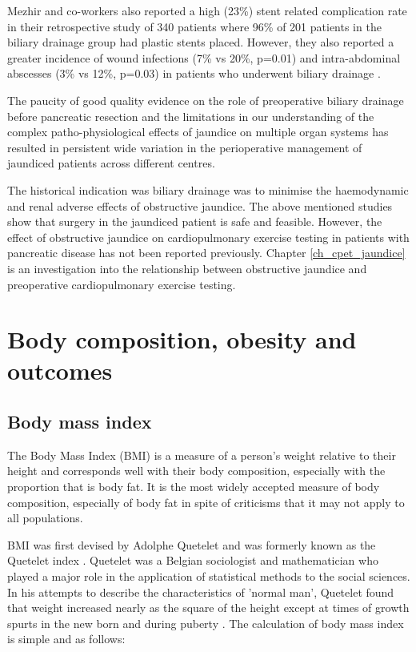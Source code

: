Mezhir and co-workers also reported a high (23\%) stent related complication rate in their retrospective study of 340 patients where 96\% of 201 patients in the biliary drainage group had plastic stents placed. 
However, they also reported a greater incidence of wound infections (7\% vs 20\%, p=0.01) and intra-abdominal abscesses (3\% vs 12\%, p=0.03) in patients who underwent biliary drainage \parencite{mezhir_matched_2009}.

The paucity of good quality evidence on the role of preoperative biliary drainage before pancreatic resection \parencite{wang_preoperative_2008} and the limitations in our understanding of the complex patho-physiological effects of jaundice on multiple organ systems has resulted in persistent wide variation in the perioperative management of jaundiced patients across different centres.

The historical indication was biliary drainage was to minimise the haemodynamic and renal adverse effects of obstructive jaundice. 
The above mentioned studies show that surgery in the jaundiced patient is safe and feasible. 
However, the effect of obstructive jaundice on cardiopulmonary exercise testing in patients with pancreatic disease has not been reported previously. 
Chapter \ref{ch_cpet_jaundice} is an investigation into the relationship between obstructive jaundice and preoperative cardiopulmonary exercise testing.

\section{Body composition, obesity and outcomes}

\subsection{Body mass index}

The Body Mass Index (BMI) is a measure of a person's weight relative to their height and corresponds well with their body composition, especially with the proportion that is body fat. 
It is the most widely accepted measure of body composition, especially of body fat in spite of criticisms that it may not apply to all populations. 

BMI was first devised by Adolphe Quetelet and was formerly known as the Quetelet index \parencite{eknoyan_adolphe_2008}. 
Quetelet was a Belgian sociologist and mathematician who played a major role in the application of statistical methods to the social sciences. 
In his attempts to describe the characteristics of 'normal man', Quetelet found that weight increased nearly as the square of the height except at times of growth spurts in the new born and during puberty \parencite{quetelet_treatise_1842}. 
The calculation of body mass index is simple and as follows:

